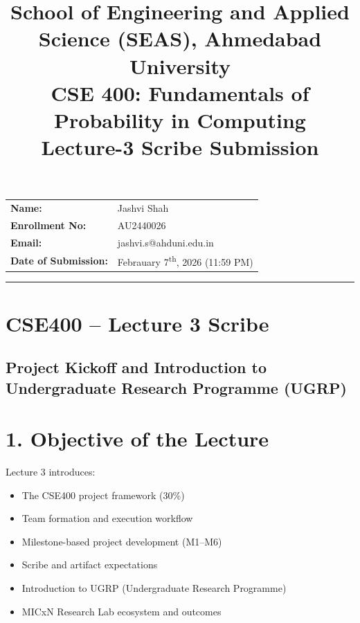 \documentclass[11pt]{article}
\title{
    \normalsize School of Engineering and Applied Science (SEAS), Ahmedabad University \\
    \vspace{0.2cm}
    \textbf{CSE 400: Fundamentals of Probability in Computing}\\
    \Large Lecture-3 Scribe Submission
}
\author{}
\date{}
\begin{document}
\maketitle

\vspace{-2cm}
\begin{center}
    \begin{tabular}{ll}
        \textbf{Name:} & {Jashvi Shah \hspace{2.5in}} \\ [1.5ex]
        \textbf{Enrollment No:} & {AU2440026 \hspace{2.5in}} \\ [1.5ex]
        \textbf{Email:} & {jashvi.s@ahduni.edu.in \hspace{2.1in}} \\ [1.5ex]
        \textbf{Date of Submission:} & {Febrauary 7\textsuperscript{th}, 2026 (11:59 PM) \hspace{1.2in}}
    \end{tabular}
\end{center}

\hrule
\vspace{0.5cm}

\section*{CSE400 – Lecture 3 Scribe}
\subsection*{Project Kickoff and Introduction to Undergraduate Research Programme (UGRP)}

\section*{1. Objective of the Lecture}

Lecture 3 introduces:

\begin{itemize}
\item The CSE400 project framework (30\%)
\item Team formation and execution workflow
\item Milestone-based project development (M1–M6)
\item Scribe and artifact expectations
\item Introduction to UGRP (Undergraduate Research Programme)
\item MICxN Research Lab ecosystem and outcomes
\end{itemize}
\end{document}
